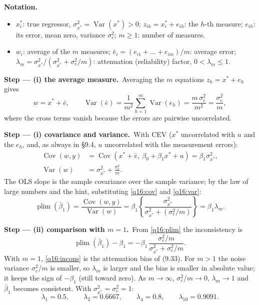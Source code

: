 \documentclass[11pt,a4paper]{article}
\newenvironment{notacao}{\par\smallskip\noindent\textbf{Notation.}\begin{itemize}[leftmargin=1.4em,topsep=1pt,itemsep=0pt]\small}{\end{itemize}}
\newcommand{\passo}[2]{\par\smallskip\noindent\textbf{Step --- #1.}~#2}
\begin{document}
\begin{sol}
\begin{notacao}
\item $x_i^*$: true regressor, $\sigma_{x^*}^2=\operatorname{Var}(x^*)>0$; $z_{ih}=x_i^*+e_{ih}$: the $h$-th measure;
$e_{ih}$: its error, mean zero, variance $\sigma_e^2$; $m\geq1$: number of measures.
\item $w_i$: average of the $m$ measures; $\bar e_i=(e_{i1}+\dots+e_{im})/m$: average error;
$\lambda_m=\sigma_{x^*}^2/(\sigma_{x^*}^2+\sigma_e^2/m)$: attenuation (reliability) factor, $0<\lambda_m\leq1$.
\end{notacao}

\passo{(i) the average measure}{Averaging the $m$ equations $z_h=x^*+e_h$ gives
\begin{equation}
w=x^*+\bar e,\qquad \operatorname{Var}(\bar e)=\frac{1}{m^2}\sum_{h=1}^m\operatorname{Var}(e_h)=\frac{m\,\sigma_e^2}{m^2}=\frac{\sigma_e^2}{m},\label{q16:ebar}
\end{equation}
where the cross terms vanish because the errors are pairwise uncorrelated.}

\passo{(i) covariance and variance}{With CEV ($x^*$ uncorrelated with $u$ and the $e_h$, and, as always in
\S9.4, $u$ uncorrelated with the measurement errors):
\begin{align}
\operatorname{Cov}(w,y)&=\operatorname{Cov}(x^*+\bar e,\ \beta_0+\beta_1x^*+u)=\beta_1\sigma_{x^*}^2,\label{q16:cov}\\
\operatorname{Var}(w)&=\sigma_{x^*}^2+\frac{\sigma_e^2}{m}.\label{q16:var}
\end{align}
The OLS slope is the sample covariance over the sample variance; by the law of large numbers and the hint,
substituting \eqref{q16:cov} and \eqref{q16:var}:
\begin{equation}
\operatorname{plim}(\bar\beta_1)=\frac{\operatorname{Cov}(w,y)}{\operatorname{Var}(w)}=\beta_1\left\{\frac{\sigma_{x^*}^2}{\sigma_{x^*}^2+(\sigma_e^2/m)}\right\}=\beta_1\lambda_m.\label{q16:plim}
\end{equation}}

\passo{(ii) comparison with $m=1$}{From \eqref{q16:plim} the inconsistency is
\begin{equation}
\operatorname{plim}(\bar\beta_1)-\beta_1=-\beta_1\,\frac{\sigma_e^2/m}{\sigma_{x^*}^2+\sigma_e^2/m}.\label{q16:incons}
\end{equation}
With $m=1$, \eqref{q16:incons} is the attenuation bias of (9.33). For $m>1$ the noise variance $\sigma_e^2/m$
is smaller, so $\lambda_m$ is larger and the bias is smaller in absolute value; it keeps the sign of
$-\beta_1$ (still toward zero). As $m\to\infty$, $\sigma_e^2/m\to0$, $\lambda_m\to1$ and $\bar\beta_1$ becomes
consistent. With $\sigma_{x^*}^2=\sigma_e^2=1$:
\begin{equation}
\lambda_1=0.5,\qquad\lambda_2=0.6667,\qquad\lambda_4=0.8,\qquad\lambda_{10}=0.9091.\label{q16:lam}
\end{equation}}


\end{sol}
\end{document}
